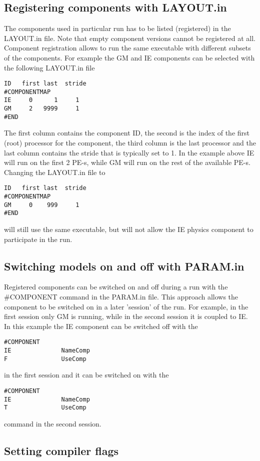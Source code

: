 \subsection{Registering components with LAYOUT.in}

The components used in particular run has to be listed (registered)
in the LAYOUT.in file. 
Note that empty component versions cannot be registered at all.
Component registration allows to run the same executable with different 
subsets of the components. For example the GM and IE components 
can be selected with the following LAYOUT.in file
\begin{verbatim}
ID   first last  stride
#COMPONENTMAP
IE     0      1     1
GM     2   9999     1
#END
\end{verbatim}
The first column contains the component ID, the second is the index
of the first (root) processor for the component, the third column is the
last processor and the last column contains the stride 
that is typically set to 1.
In the example above IE will run on the first 2 PE-s,
while GM will run on the rest of the available PE-s.
Changing the LAYOUT.in file to
\begin{verbatim}
ID   first last  stride
#COMPONENTMAP
GM     0    999     1
#END
\end{verbatim}
will still use the same executable, but will not allow the IE 
physics component to participate in the run.

\subsection{Switching models on and off with PARAM.in}

Registered components can be switched on and off during a run
with the \#COMPONENT command in the PARAM.in file. 
This approach allows the component to be switched on in a later 
'session' of the run. For example, in the first session only GM 
is running, while in the second session it is coupled to IE. 
In this example the IE component can be switched off with the
\begin{verbatim}
#COMPONENT
IE              NameComp
F               UseComp
\end{verbatim}
in the first session and it can be switched on with the
\begin{verbatim}
#COMPONENT
IE              NameComp
T               UseComp
\end{verbatim}
command in the second session.

\subsection{Setting compiler flags}

